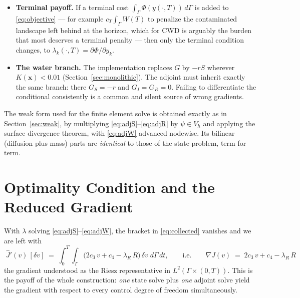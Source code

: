 \documentclass[11pt]{article}
\begin{document}
\begin{itemize}
\item \textbf{Terminal payoff.} If a terminal cost $\int_\Gamma \Phi(y(\cdot,T))\,d\Gamma$ is added to \eqref{eq:objective} --- for example $c_T\int_\Gamma W(T)$ to penalize the contaminated landscape left behind at the horizon, which for CWD is arguably the burden that most deserves a terminal penalty --- then only the terminal condition changes, to $\lambda_k(\cdot,T) = \partial\Phi/\partial y_k$.

\item \textbf{The water branch.} The implementation replaces $G$ by $-rS$ wherever $K(\mathbf{x})<0.01$ (Section~\ref{sec:monolithic}). The adjoint must inherit exactly the same branch: there $G_S = -r$ and $G_I=G_R=0$. Failing to differentiate the conditional consistently is a common and silent source of wrong gradients.
\end{itemize}

The weak form used for the finite element solve is obtained exactly as in Section~\ref{sec:weak}, by multiplying \eqref{eq:adjS}--\eqref{eq:adjR} by $\psi\in V_h$ and applying the surface divergence theorem, with \eqref{eq:adjW} advanced nodewise. Its bilinear (diffusion plus mass) parts are \emph{identical} to those of the state problem, term for term.

\section{Optimality Condition and the Reduced Gradient}
\label{sec:optimality}

With $\lambda$ solving \eqref{eq:adjS}--\eqref{eq:adjW}, the bracket in \eqref{eq:collected} vanishes and we are left with
\begin{equation}
\boxed{\;
\hat J'(v)\,[\delta v] \;=\; \int_0^T\!\!\int_\Gamma \Big(2c_3\,v + c_4 - \lambda_R\,R\Big)\,\delta v \;d\Gamma\,dt,
\qquad\text{i.e.}\qquad
\nabla \hat J(v) \;=\; 2c_3\,v + c_4 - \lambda_R\,R \;}
\label{eq:gradient}
\end{equation}
the gradient understood as the Riesz representative in $L^2(\Gamma\times(0,T))$. This is the payoff of the whole construction: \emph{one} state solve plus \emph{one} adjoint solve yield the gradient with respect to every control degree of freedom simultaneously.
\end{document}

